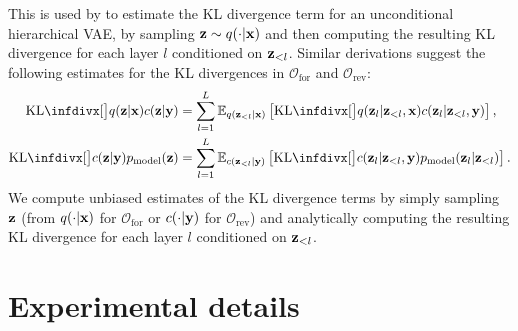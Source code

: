 This is used by \citet{vahdat2020nvae,child2020very} to estimate the KL
divergence term for an unconditional hierarchical VAE, by sampling $\mathbf{z}{}\sim
q(\cdot|\mathbf{x}{})$ and then computing the resulting KL divergence for each layer $l$
conditioned on $\mathbf{z}{}_{<l}$. Similar derivations suggest the following estimates for
the KL divergences in $\mathcal{O}_\mathrm{for}$ and $\mathcal{O}_\text{rev}$:
\begin{align}
  \kl[\big]{q(\z{}|\I{})}{\partq{}(\z{}|\partI{})} &= \sum_{l=1}^L \EX_{q(\z{}_{<l}|\I{})} \left[ \kl[\big]{q(\z{}_l|\z{}_{<l}, \I{})}{\partq{}(\z{}_l|\z{}_{<l}, \partI{})} \right], \\
  \kl[\big]{\partq{}(\z{}|\partI{})}{\pmodel{}(\z{})} &= \sum_{l=1}^L \EX_{\partq{}(\z{}_{<l}|\partI{})} \left[ \kl[\big]{\partq{}(\z{}_l|\z{}_{<l}, \partI{})}{\pmodel{}(\z{}_l|\z{}_{<l})} \right].
\end{align}
We compute unbiased estimates of the KL divergence terms by simply sampling $\mathbf{z}{}$
(from $q(\cdot|\mathbf{x}{})$ for $\mathcal{O}_\mathrm{for}$ or
$c{}(\cdot|\mathbf{y}{})$ for $\mathcal{O}_\text{rev}$) and analytically
computing the resulting KL divergence for each layer $l$ conditioned on
$\mathbf{z}{}_{<l}$.


\section{Experimental details} \label{supp:cigcvae-exp-details}

